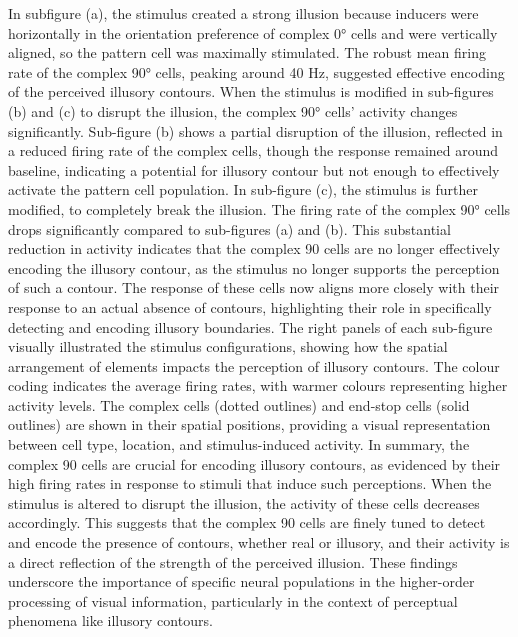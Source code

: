 \documentclass[12pt]{article}
\begin{document}
In subfigure (a), the stimulus created a strong illusion because inducers were horizontally in the orientation preference of complex 0° cells and were vertically aligned, so the pattern cell was maximally stimulated. The robust mean firing rate of the complex 90° cells, peaking around 40 Hz, suggested effective encoding of the perceived illusory contours. When the stimulus is modified in sub-figures (b) and (c) to disrupt the illusion, the complex 90° cells' activity changes significantly. Sub-figure (b) shows a partial disruption of the illusion, reflected in a reduced firing rate of the complex cells, though the response remained around baseline, indicating a potential for illusory contour but not enough to effectively activate the pattern cell population.
\bigbreak
In sub-figure (c), the stimulus is further modified, to completely break the illusion. The firing rate of the complex 90° cells drops significantly compared to sub-figures (a) and (b). This substantial reduction in activity indicates that the complex 90 cells are no longer effectively encoding the illusory contour, as the stimulus no longer supports the perception of such a contour. The response of these cells now aligns more closely with their response to an actual absence of contours, highlighting their role in specifically detecting and encoding illusory boundaries. The right panels of each sub-figure visually illustrated the stimulus configurations, showing how the spatial arrangement of elements impacts the perception of illusory contours. The colour coding indicates the average firing rates, with warmer colours representing higher activity levels. The complex cells (dotted outlines) and end-stop cells (solid outlines) are shown in their spatial positions, providing a visual representation between cell type, location, and stimulus-induced activity.
\bigbreak
In summary, the complex 90 cells are crucial for encoding illusory contours, as evidenced by their high firing rates in response to stimuli that induce such perceptions. When the stimulus is altered to disrupt the illusion, the activity of these cells decreases accordingly. This suggests that the complex 90 cells are finely tuned to detect and encode the presence of contours, whether real or illusory, and their activity is a direct reflection of the strength of the perceived illusion. These findings underscore the importance of specific neural populations in the higher-order processing of visual information, particularly in the context of perceptual phenomena like illusory contours.
\end{document}
